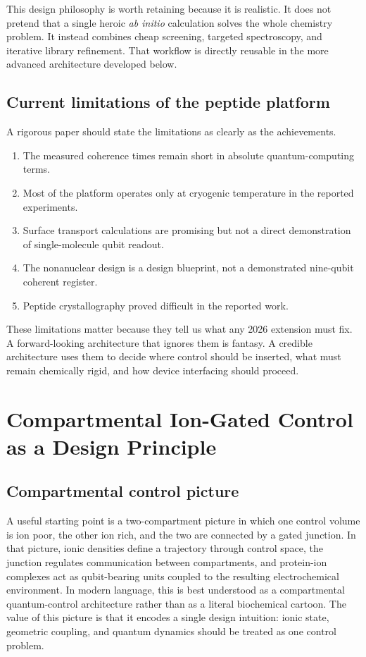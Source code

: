 \documentclass[11pt]{report}
\theoremstyle{definition}
\begin{document}
This design philosophy is worth retaining because it is realistic. It does not pretend that a single heroic \emph{ab initio} calculation solves the whole chemistry problem. It instead combines cheap screening, targeted spectroscopy, and iterative library refinement. That workflow is directly reusable in the more advanced architecture developed below.

\section{Current limitations of the peptide platform}
A rigorous paper should state the limitations as clearly as the achievements.

\begin{enumerate}[leftmargin=2em]
\item The measured coherence times remain short in absolute quantum-computing terms.
\item Most of the platform operates only at cryogenic temperature in the reported experiments.
\item Surface transport calculations are promising but not a direct demonstration of single-molecule qubit readout.
\item The nonanuclear design is a design blueprint, not a demonstrated nine-qubit coherent register.
\item Peptide crystallography proved difficult in the reported work.
\end{enumerate}

These limitations matter because they tell us what any 2026 extension must fix. A forward-looking architecture that ignores them is fantasy. A credible architecture uses them to decide where control should be inserted, what must remain chemically rigid, and how device interfacing should proceed.

\chapter{Compartmental Ion-Gated Control as a Design Principle}

\section{Compartmental control picture}
A useful starting point is a two-compartment picture in which one control volume is ion poor, the other ion rich, and the two are connected by a gated junction. In that picture, ionic densities define a trajectory through control space, the junction regulates communication between compartments, and protein-ion complexes act as qubit-bearing units coupled to the resulting electrochemical environment. In modern language, this is best understood as a compartmental quantum-control architecture rather than as a literal biochemical cartoon.
The value of this picture is that it encodes a single design intuition: ionic state, geometric coupling, and quantum dynamics should be treated as one control problem.
\end{document}
